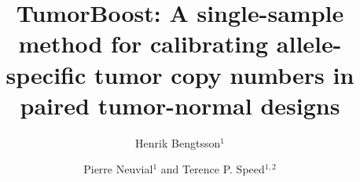 \documentclass[10pt]{bmc_article}
\newenvironment{bmcformat}{\fussy\setboolean{publ}{true}}{\fussy}
\begin{document}
\begin{bmcformat}



\title{TumorBoost: A single-sample method for calibrating allele-specific tumor copy numbers in paired tumor-normal designs}



\author{Henrik Bengtsson\correspondingauthor$^1$%
      \and
         Pierre Neuvial$^1$%
       and 
         Terence P. Speed$^{1,2}$%
   }
      


\address{%
    \iid(1) Department of Statistics, University of California, Berkeley, USA\\
    \iid(2) Bioinformatics Division, Walter \& Eliza Hall Institute of Medical Research, Parkville, Australia
}%

\maketitle




\end{bmcformat}
\end{document}
